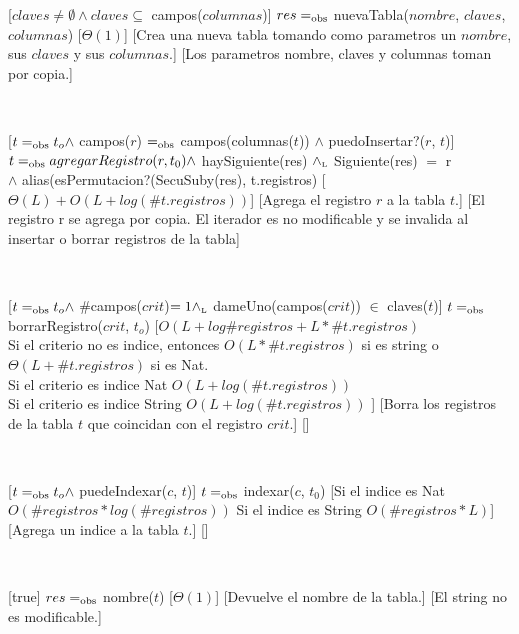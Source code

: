 \begin{Interfaz}

[$claves \neq \emptyset \land claves \subseteq$ campos($columnas$)]
{$res =_{\mathrm{obs}}$ nuevaTabla($nombre$, $claves$, $columnas$)}
[$\Theta(1)$]
[Crea una nueva tabla tomando como parametros un $nombre$, sus $claves$ y sus $columnas$.]
[Los parametros nombre, claves y columnas toman por copia.]

~

[$t =_{\mathrm{obs}} t_o \land$ campos($r$) $=_{\mathrm{obs}}$ campos(columnas($t$)) $\land$ puedoInsertar?($r$, $t$)]
{$t =_{\mathrm{obs}} agregarRegistro(r, t_0) \land$ haySiguiente(res) $\land_{\mathrm{\scriptscriptstyle{L}}}$ Siguiente(res) $=$ r \\ $\land$ alias(esPermutacion?(SecuSuby(res), t.registros)}
[$\Theta(L) + O(L + log (\#t.registros))$]
[Agrega el registro $r$ a la tabla $t$.]
[El registro r se agrega por copia. El iterador es no modificable y se invalida al insertar o borrar registros de la tabla]

~

[$t =_{\mathrm{obs}} t_o \land$ \#campos($crit$)$ = 1 \land_{\mathrm{\scriptscriptstyle{L}}}$ dameUno(campos($crit$)) $\in$ claves($t$)]
{$t =_{\mathrm{obs}}$ borrarRegistro($crit$, $t_o$)}
[$O(L + log \#registros + L * \#t.registros)$\\ 
Si el criterio no es indice, entonces $O(L * \#t.registros)$ si es string o $\Theta(L + \#t.registros)$ si es Nat. \\
Si el criterio es indice Nat $O(L + log(\#t.registros))$ \\
Si el criterio es indice String $O(L + log(\#t.registros))$ 
]
[Borra los registros de la tabla $t$ que coincidan con el registro $crit$.]
[]

~

[$t =_{\mathrm{obs}} t_o \land$ puedeIndexar($c$, $t$)]
{$t =_{\mathrm{obs}}$ indexar($c$, $t_0$)}
[Si el indice es Nat $O(\#registros * log(\#registros))$
Si el indice es String $O(\#registros * L)$]
[Agrega un indice a la tabla $t$.]
[]

~

[true]
{$res =_{\mathrm{obs}}$ nombre($t$)}
[$\Theta(1)$]
[Devuelve el nombre de la tabla.]
[El string no es modificable.]


\end{Interfaz}

